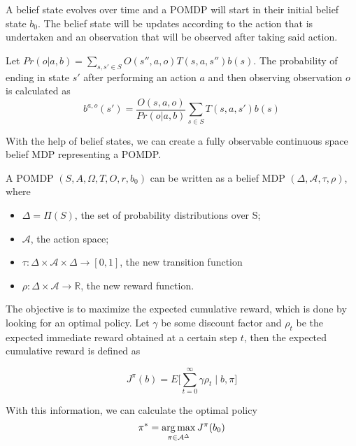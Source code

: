A belief state evolves over time and a POMDP will start in their initial belief state $b_0$.
The belief state will be updates according to the action that is undertaken and an observation that will be observed after taking said action.

\begin{definition}
Let $Pr(o|a,b)=\sum_{s,s'\in S}O(s'',a,o)T(s,a,s'')b(s)$. The probability of ending in state $s'$ after performing an action $a$ and then observing observation $o$ is calculated as
\begin{equation*}
	b^{a,o}(s')=\frac{O(s,a,o)}{Pr(o | a,b)}\sum_{s\in S} T(s,a,s')b(s)
\end{equation*}
\end{definition}

With the help of belief states, we can create a fully observable continuous space belief MDP representing a POMDP.

\begin{definition}
	A POMDP $(S, A, \Omega, T, O, r, b_0)$ can be written as a belief MDP $(\Delta, \mathcal{A}, \tau, \rho)$, where
	\begin{itemize}
		\item $\Delta = \Pi(S)$, the set of probability distributions over S;
		\item $\mathcal{A}$, the action space;
		\item $\tau : \Delta \times \mathcal{A} \times \Delta \to [0,1]$, the new transition function
		\item $\rho: \Delta \times \mathcal{A} \to \mathds{R}$, the new reward function.
	\end{itemize}
\end{definition}

The objective is to maximize the expected cumulative reward, which is done by looking for an optimal policy. Let $\gamma$ be some discount factor and $\rho_t$ be the expected immediate reward obtained at a certain step $t$, then the expected cumulative reward is defined as

\begin{equation*}
	J^\pi(b)=E \big[\sum_{t=0}^{\infty}\gamma \rho_t\mid b,\pi\big]
\end{equation*}

With this information, we can calculate the optimal policy 
\begin{equation}
\pi^* = \operatorname*{arg\,max}_{\pi\in \mathcal{A}^\Delta} J^\pi(b_0)
\end{equation}

